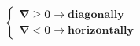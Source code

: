 \documentclass[preview]{standalone}
\begin{document}
\begin{center}
$\boldsymbol{\begin{cases}\nabla\ge0\rightarrow diagonally\\\nabla<0\rightarrow horizontally\end{cases}}$
\end{center}
\end{document}
